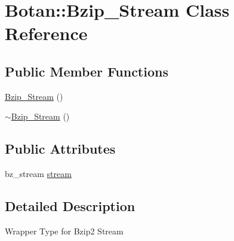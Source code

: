 \hypertarget{classBotan_1_1Bzip__Stream}{\section{Botan\-:\-:Bzip\-\_\-\-Stream Class Reference}
\label{classBotan_1_1Bzip__Stream}
}
\subsection*{Public Member Functions}
\begin{DoxyCompactItemize}
\item 
\hyperlink{classBotan_1_1Bzip__Stream_a07a2863c9ad23b63494afb4e4546e82d}{Bzip\-\_\-\-Stream} ()
\item 
\hyperlink{classBotan_1_1Bzip__Stream_a2db8d15361c1fd1a20885d43ca01ef07}{$\sim$\-Bzip\-\_\-\-Stream} ()
\end{DoxyCompactItemize}
\subsection*{Public Attributes}
\begin{DoxyCompactItemize}
\item 
bz\-\_\-stream \hyperlink{classBotan_1_1Bzip__Stream_ab550c2b361915a2237666117a69823c0}{stream}
\end{DoxyCompactItemize}


\subsection{Detailed Description}
Wrapper Type for Bzip2 Stream 

